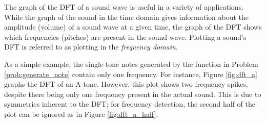 The graph of the DFT of a sound wave is useful in a variety of applications.
While the graph of the sound in the time domain gives information about the amplitude (volume) of a sound wave at a given time, the graph of the DFT shows which frequencies (pitches) are present in the sound wave.
Plotting a sound's DFT is referred to as plotting in the \emph{frequency domain}.

As a simple example, the single-tone notes generated by the function in Problem \ref{prob:generate_note} contain only one frequency.
For instance, Figure \ref{fig:dft_a} graphs the DFT of an A tone.
However, this plot shows two frequency spikes, despite there being only one frequency present in the actual sound.
This is due to symmetries inherent to the DFT; for frequency detection, the second half of the plot can be ignored as in Figure \ref{fig:dft_a_half}.

